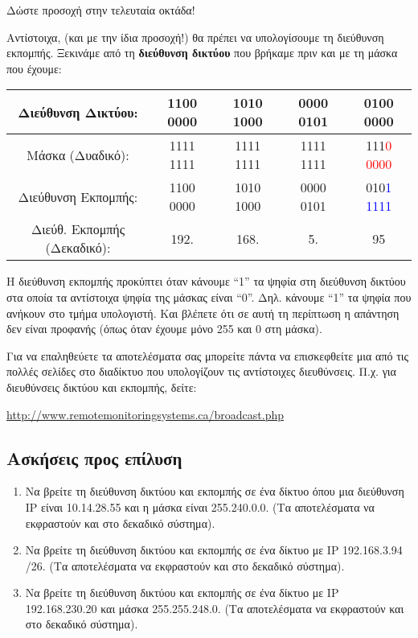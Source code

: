 Δώστε προσοχή στην τελευταία οκτάδα!

Αντίστοιχα, (και με την ίδια προσοχή!) θα πρέπει να υπολογίσουμε τη διεύθυνση εκπομπής. Ξεκινάμε από τη \textbf{διεύθυνση δικτύου} που βρήκαμε πριν και με τη μάσκα που έχουμε:

\begin{center}
\fontsize{9}{11}
\ttfamily
\begin{tabular}{|c|c|c|c|c|}
\hline
 Διεύθυνση Δικτύου: & 1100 0000 & 1010 1000 & 0000 0101 & 0100 0000\\ 
\hline
Μάσκα (Δυαδικό): & 1111 1111 & 1111 1111 & 1111 1111 & 111\textcolor{red}{0 0000} \\
\hline
Διεύθυνση Εκπομπής: & 1100 0000 & 1010 1000 & 0000 0101 & 010\textcolor{blue}{1 1111}\\
 \hline
 Διεύθ. Εκπομπής (Δεκαδικό): & 192. & 168. & 5. & 95\\
 \hline
\end{tabular}
\normalfont
\end{center}

Η διεύθυνση εκπομπής προκύπτει όταν κάνουμε ``1'' τα ψηφία στη διεύθυνση δικτύου στα οποία τα αντίστοιχα ψηφία της μάσκας είναι ``0''. Δηλ. κάνουμε ``1'' τα ψηφία που ανήκουν στο τμήμα υπολογιστή. Και βλέπετε ότι σε αυτή τη περίπτωση η απάντηση δεν είναι προφανής (όπως όταν έχουμε μόνο 255 και 0 στη μάσκα).

Για να επαληθεύετε τα αποτελέσματα σας μπορείτε πάντα να επισκεφθείτε μια από τις πολλές σελίδες στο διαδίκτυο που υπολογίζουν τις αντίστοιχες διευθύνσεις. Π.χ. για διευθύνσεις δικτύου και εκπομπής, δείτε:

\begin{center}
\url{http://www.remotemonitoringsystems.ca/broadcast.php}
\end{center}

\subsection*{Ασκήσεις προς επίλυση}

\begin{enumerate}
\item Να βρείτε τη διεύθυνση δικτύου και εκπομπής σε ένα δίκτυο όπου μια διεύθυνση IP είναι 10.14.28.55 και η μάσκα είναι 255.240.0.0. (Τα αποτελέσματα να εκφραστούν και στο δεκαδικό σύστημα).
\item Να βρείτε τη διεύθυνση δικτύου και εκπομπής σε ένα δίκτυο με IP 192.168.3.94 /26. (Τα αποτελέσματα να εκφραστούν και στο δεκαδικό σύστημα).
\item Να βρείτε τη διεύθυνση δικτύου και εκπομπής σε ένα δίκτυο με IP 192.168.230.20 και μάσκα 255.255.248.0. (Τα αποτελέσματα να εκφραστούν και στο δεκαδικό σύστημα).
\end{enumerate}

